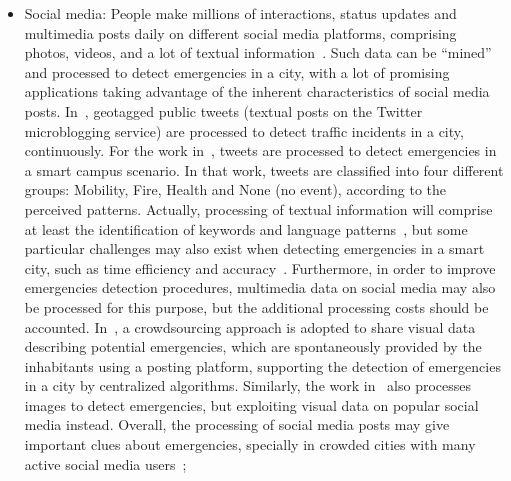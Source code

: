 \begin{refsection}
\begin{itemize}
  \item Social media: People make millions of interactions, status updates and multimedia posts daily on different social media platforms, comprising photos, videos, and a lot of textual information~\cite{socialmedia2}. Such data can be ``mined'' and processed to detect emergencies in a city, with a lot of promising applications taking advantage of the inherent characteristics of social media posts. In~\cite{socialmedia3}, geotagged public tweets (textual posts on the Twitter microblogging service) are processed to detect traffic incidents in a city, continuously. For the work in~\cite{twitter4}, tweets are processed to detect emergencies in a smart campus scenario. In that work, tweets are classified into four different groups: Mobility, Fire, Health and None (no event), according to the perceived patterns. Actually, processing of textual information will comprise at least the identification of keywords and language patterns~\cite{twitter1}, but some particular challenges may also exist when detecting emergencies in a smart city, such as time efficiency and accuracy~\cite{socialmediatime1}. Furthermore, in order to improve emergencies detection procedures, multimedia data on social media may also be processed for this purpose, but the additional processing costs should be accounted. In~\cite{crowdsourcing5}, a crowdsourcing approach is adopted to share visual data describing potential emergencies, which are spontaneously provided by the inhabitants using a posting platform, supporting the detection of emergencies in a city by centralized algorithms. Similarly, the work in~\cite{crowdsourcing7} also processes images to detect emergencies, but exploiting visual data on popular social media instead. Overall, the processing of social media posts may give important clues about emergencies, specially in crowded cities with many active social media users~\cite{socialmedia4,twitter4};
  

\end{itemize}
\end{refsection}
